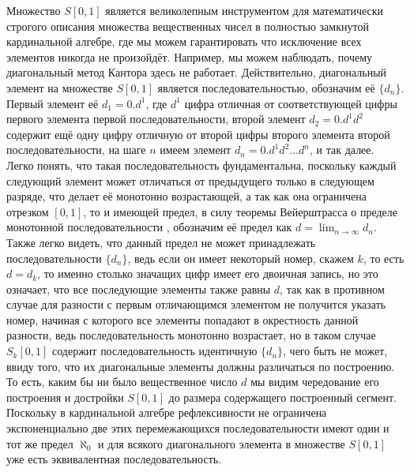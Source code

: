 \documentclass[12pt]{article}
\begin{document}
Множество $S[0, 1]$ является великолепным инструментом для математически строгого описания множества вещественных чисел в полностью замкнутой кардинальной алгебре, где мы можем гарантировать что исключение всех элементов никогда не произойдёт. Например, мы можем наблюдать, почему диагональный метод Кантора здесь не работает. Действительно, диагональный элемент на множестве $S[0, 1]$ является последовательностью, обозначим её $\{d_n\}$. Первый элемент её $d_1 = 0.d^1$, где $d^1$ цифра отличная от соответствующей цифры первого элемента первой последовательности, второй элемент $d_2 = 0.d^1d^2$ содержит ещё одну цифру отличную от второй цифры второго элемента второй последовательности, на шаге $n$ имеем элемент $d_n = 0.d^1d^2{\dots}d^n$, и так далее. Легко понять, что такая последовательность фундаментальна, поскольку каждый следующий элемент может отличаться от предыдущего только в следующем разряде, что делает её монотонно возрастающей, а так как она ограничена отрезком $[0, 1]$, то и имеющей предел, в силу теоремы Вейерштрасса о пределе монотонной последовательности \cite{matan-weierstrass}, обозначим её предел как $d = \lim_{n\to\infty} d_n$. Также легко видеть, что данный предел не может принадлежать последовательности $\{d_n\}$, ведь если он имеет некоторый номер, скажем $k$, то есть $d = d_k$, то именно столько значащих цифр имеет его двоичная запись, но это означает, что все последующие элементы также равны $d$, так как в противном случае для разности с первым отличающимся элементом не получится указать номер, начиная с которого все элементы попадают в окрестность данной разности, ведь последовательность монотонно возрастает, но в таком случае $S_k[0, 1]$ содержит последовательность идентичную $\{d_n\}$, чего быть не может, ввиду того, что их диагональные элементы должны различаться по построению. То есть, каким бы ни было вещественное число $d$ мы видим чередование его построения и достройки $S[0, 1]$ до размера содержащего построенный сегмент. Поскольку в кардинальной алгебре рефлексивности не ограничена экспоненциально две этих перемежающихся последовательности имеют один и тот же предел $\aleph_0$ и для всякого диагонального элемента в множестве $S[0, 1]$ уже есть эквивалентная последовательность.
\end{document}
